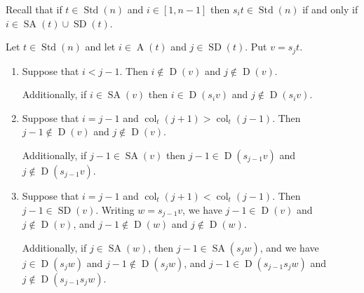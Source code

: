 \documentclass[ALCO,ThmDefs,Unicode,epreuves]{cedram}
\DeclareMathOperator{\col}{col}
\DeclareMathOperator{\STD}{Std}
\DeclareMathOperator{\SD}{SD}
\DeclareMathOperator{\SA}{SA}
\DeclareMathOperator{\D}{D}
\DeclareMathOperator{\A}{A}
\begin{document}
Recall that if $t\in\STD(n)$ and $i\in[1,n-1]$ then $s_it\in\STD(n)$ if and only if
$i\in\SA(t)\cup\SD(t)$.

\begin{lemm}\label{variousaltpaths}
Let $t\in\STD(n)$ and let $i\in\A(t)$ and $j\in\SD(t)$. Put $v=s_jt$.
\begin{enumerate}[label=(\roman*),topsep=1 pt]
\item\label{lemma7.29_i} Suppose that $i<j-1$. Then $i\notin\D(v)$ and $j\notin\D(v)$.

\noindent
Additionally, if $i\in\SA(v)$ then $i\in\D(s_{i}v)$ and $j\notin\D(s_{i}v)$.
\item\label{lemma7.29_ii} Suppose that $i=j-1$ and $\col_t(j+1)>\col_t(j-1)$.
Then $j-1\notin\D(v)$ and $j\notin\D(v)$.

\noindent
Additionally, if $j-1\in\SA(v)$ then
$j-1\in\D(s_{j-1}v)$ and $j\notin\D(s_{j-1}v)$.
\item\label{lemma7.29_iii} Suppose that $i=j-1$ and $\col_t(j+1)<\col_t(j-1)$. Then
$j-1\in\SD(v)$. Writing $w=s_{j-1}v$, we have
$j-1\in\D(v)$ and $j\notin\D(v)$, and $j-1\notin\D(w)$ and
$j\notin\D(w)$.

\noindent
Additionally, if $j\in\SA(w)$, then $j-1\in\SA(s_jw)$,
and we have $j\in\D(s_jw)$ and $j-1\notin\D(s_{j}w)$, and
$j-1\in\D(s_{j-1}s_jw)$ and $j\notin\D(s_{j-1}s_jw)$.
\end{enumerate}
\end{lemm}
\end{document}
